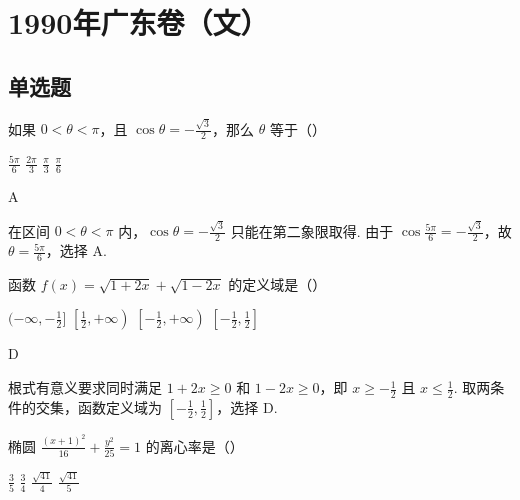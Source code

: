 \chapter{1990年广东卷（文）}

\section{单选题}

\begin{problem}
如果 \(0<\theta<\pi\)，且 \(\cos\theta=-\frac{\sqrt{3}}{2}\)，那么 \(\theta\) 等于（\quad）

\choices
    {\(\frac{5\pi}{6}\)}
    {\(\frac{2\pi}{3}\)}
    {\(\frac{\pi}{3}\)}
    {\(\frac{\pi}{6}\)}
\end{problem}

\begin{answer}
A
\end{answer}

\begin{solution}
在区间 \(0<\theta<\pi\) 内，\(\cos\theta=-\frac{\sqrt{3}}{2}\) 只能在第二象限取得. 由于 \(\cos\frac{5\pi}{6}=-\frac{\sqrt{3}}{2}\)，故 \(\theta=\frac{5\pi}{6}\)，选择 A.
\end{solution}

\begin{problem}
函数 \(f(x)=\sqrt{1+2x}+\sqrt{1-2x}\) 的定义域是（\quad）

\choices
    {\((-\infty,-\frac{1}{2}]\)}
    {\(\left[\frac{1}{2},+\infty\right)\)}
    {\(\left[-\frac{1}{2},+\infty\right)\)}
    {\(\left[-\frac{1}{2},\frac{1}{2}\right]\)}
\end{problem}

\begin{answer}
D
\end{answer}

\begin{solution}
根式有意义要求同时满足 \(1+2x\geqslant0\) 和 \(1-2x\geqslant0\)，即 \(x\geqslant-\frac{1}{2}\) 且 \(x\leqslant\frac{1}{2}\). 取两条件的交集，函数定义域为 \(\left[-\frac{1}{2},\frac{1}{2}\right]\)，选择 D.
\end{solution}

\begin{problem}
椭圆 \(\frac{(x+1)^2}{16}+\frac{y^2}{25}=1\) 的离心率是（\quad）

\choices
    {\(\frac{3}{5}\)}
    {\(\frac{3}{4}\)}
    {\(\frac{\sqrt{41}}{4}\)}
    {\(\frac{\sqrt{41}}{5}\)}
\end{problem}

